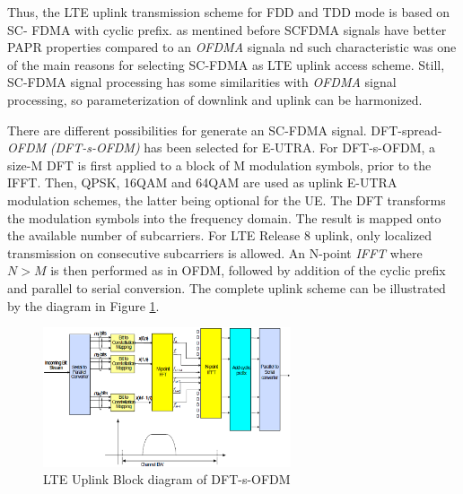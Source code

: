 Thus, the LTE uplink transmission scheme for FDD and TDD mode is based on SC-
FDMA with cyclic prefix. as mentined before  SCFDMA signals have better PAPR
properties compared to an \textit{OFDMA} signala nd such characteristic was one
of the main reasons for selecting SC-FDMA as LTE uplink access scheme. Still,
SC-FDMA signal processing has some similarities with \textit{OFDMA} signal
processing, so parameterization of downlink and uplink can be harmonized.

There are different possibilities for generate an SC-FDMA signal. DFT-spread-
\textit{OFDM} \textit{(DFT-s-OFDM)} has been selected for E-UTRA. For
DFT-s-OFDM, a size-M DFT is first applied to a block of M modulation symbols,
prior to the IFFT. Then, QPSK, 16QAM and 64QAM are used as uplink E-UTRA
modulation schemes, the latter being optional for the UE. The DFT transforms the
modulation symbols into the frequency domain. The result is mapped onto the
available number of subcarriers. For LTE Release 8 uplink, only localized
transmission on consecutive subcarriers is allowed. An N-point \textit{IFFT}
where $N>M$ is then performed as in OFDM, followed by addition of the cyclic
prefix and parallel to serial conversion. The complete uplink scheme can be
illustrated by the diagram in Figure \ref{fig:uplinkbd}.

\begin{figure}[htbp]
    \centering
    \includegraphics[width=0.65\textwidth]{./figures/uplink_scheme}
    \caption{ LTE Uplink Block diagram of DFT-s-OFDM
    \label{fig:uplinkbd}}
\end{figure}
